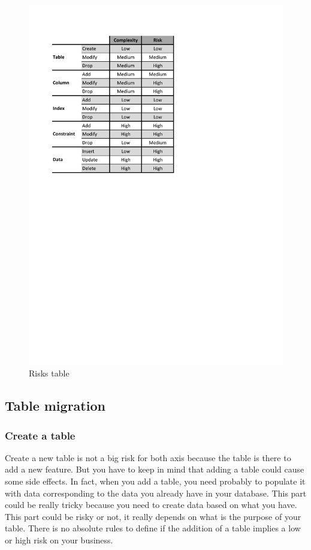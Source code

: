 \begin{figure}[h]
        \centering
        \includegraphics[scale=0.7]{images/risks.pdf}
        \caption{Risks table}
        \label{risksTable}
\end{figure}

\subsection{Table migration}

\subsubsection{Create a table\\}

Create a new table is not a big risk for both axis because the table is there to add a new feature. But you have to keep in mind that adding a table could cause some side effects. In fact, when you add a table, you need probably to populate it with data corresponding to the data you already have in your database. This part could be really tricky because you need to create data based on what you have. This part could be risky or not, it really depends on what is the purpose of your table. There is no absolute rules to define if the addition of a table implies a low or high risk on your business.

